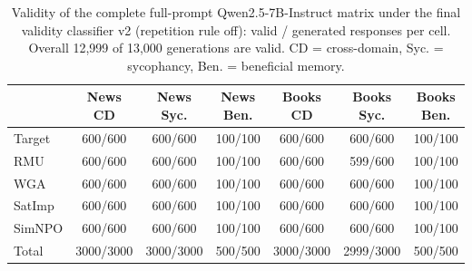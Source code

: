 \begin{table}[tb]
  \centering
  \caption{Validity of the complete full-prompt Qwen2.5-7B-Instruct matrix under the final validity classifier v2 (repetition rule off): valid / generated responses per cell. Overall 12,999 of 13,000 generations are valid. CD = cross-domain, Syc. = sycophancy, Ben. = beneficial memory.}
  \label{tab:fullprompt-validity}
  \begin{tabular}{@{}l ccc ccc@{}}
    \toprule
     & News CD & News Syc. & News Ben. & Books CD & Books Syc. & Books Ben. \\
    \midrule
    Target & 600/600 & 600/600 & 100/100 & 600/600 & 600/600 & 100/100 \\
    RMU & 600/600 & 600/600 & 100/100 & 600/600 & 599/600 & 100/100 \\
    WGA & 600/600 & 600/600 & 100/100 & 600/600 & 600/600 & 100/100 \\
    SatImp & 600/600 & 600/600 & 100/100 & 600/600 & 600/600 & 100/100 \\
    SimNPO & 600/600 & 600/600 & 100/100 & 600/600 & 600/600 & 100/100 \\
    \midrule
    Total & 3000/3000 & 3000/3000 & 500/500 & 3000/3000 & 2999/3000 & 500/500 \\
    \bottomrule
  \end{tabular}
\end{table}
